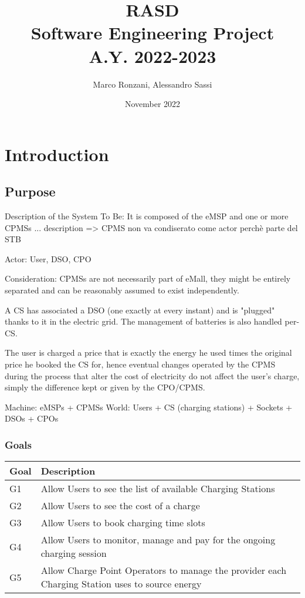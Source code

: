 \documentclass[12pt]{article}
\title{%
  \textbf{RASD} \\
  \large Software Engineering Project \\ A.Y. 2022-2023}
\author{Marco Ronzani, Alessandro Sassi}
\date{November 2022}
\begin{document}
\maketitle

\tableofcontents

\section{Introduction}

\subsection{Purpose}

Description of the System To Be:
It is composed of the eMSP and one or more CPMSs ... description
=> CPMS non va condiserato come actor perchè parte del STB

Actor: User, DSO, CPO

Consideration:
CPMSs are not necessarily part of eMall, they might be entirely separated and can be reasonably assumed to exist independently.

A CS has associated a DSO (one exactly at every instant) and is "plugged" thanks to it in the electric grid. The management of batteries is also handled per-CS.

The user is charged a price that is exactly the energy he used times the original price he booked the CS for, hence eventual changes operated by the CPMS during the process that alter the cost of electricity do not affect the user's charge, simply the difference kept or given by the CPO/CPMS.

Machine: eMSPs + CPMSs
World: Users + CS (charging stations) + Sockets + DSOs + CPOs

\subsubsection{Goals}

\begin{table}[H]
    \centering
    \setlength{\tabcolsep}{18pt}
    \renewcommand{\arraystretch}{1.2}
    \begin{tabularx}{\textwidth}{|>{\centering\hsize=0.3\hsize}X|>{\hsize=1.7\hsize}X|}
        \hline
        \textbf{Goal} & \textbf{Description} \\
        \hline
        G1 & Allow Users to see the list of available Charging Stations \\
        \hline
        G2 & Allow Users to see the cost of a charge \\
        \hline
        G3 & Allow Users to book charging time slots \\
        \hline
        G4 & Allow Users to monitor, manage and pay for the ongoing charging session \\
        \hline
        G5 & Allow Charge Point Operators to manage the provider each Charging Station uses to source energy \\
        \hline
    \end{tabularx}
    \label{tab:goals}
\end{table}
\end{document}
